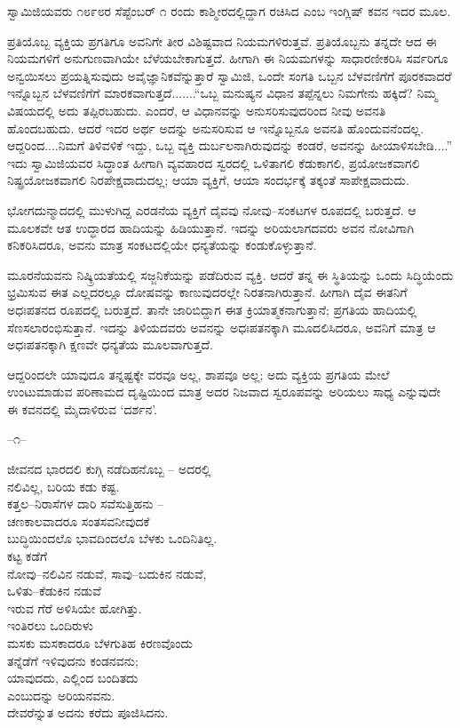 ಸ್ವಾಮಿಜಿಯವರು ೧೮೯೮ರ ಸೆಪ್ಟೆಂಬರ್ ೧ ರಂದು ಕಾಶ್ಮೀರದಲ್ಲಿದ್ದಾಗ ರಚಿಸಿದ  ಎಂಬ ಇಂಗ್ಲಿಷ್ ಕವನ ಇದರ ಮೂಲ.

ಪ್ರತಿಯೊಬ್ಬ ವ್ಯಕ್ತಿಯ ಪ್ರಗತಿಗೂ ಅವನಿಗೇ ತೀರ ವಿಶಿಷ್ಟವಾದ ನಿಯಮಗಳಿರುತ್ತವೆ. ಪ್ರತಿಯೊಬ್ಬನು ತನ್ನದೇ ಆದ ಈ ನಿಯಮಗಳಿಗೆ ಅನುಗುಣವಾಗಿಯೇ ಬೆಳೆಯಬೇಕಾಗುತ್ತದೆ. ಹೀಗಾಗಿ ಈ ನಿಯಮಗಳನ್ನು ಸಾಧಾರಣೀಕರಿಸಿ ಸರ್ವರಿಗೂ ಅನ್ವಯಿಸಲು ಪ್ರಯತ್ನಿಸುವುದು ಅವೈಜ್ಞಾನಿಕವೆನ್ನುತ್ತಾರೆ ಸ್ವಾಮಿಜಿ, ಒಂದೇ ಸಂಗತಿ ಒಬ್ಬನ ಬೆಳವಣಿಗೆಗೆ ಪೂರಕವಾದರೆ ಇನ್ನೊಬ್ಬನ ಬೆಳವಣಿಗೆಗೆ ಮಾರಕವಾಗುತ್ತದೆ.......“ಒಬ್ಬ ಮನುಷ್ಯನ ವಿಧಾನ ತಪ್ಪೆನ್ನಲು ನಿಮಗೇನು ಹಕ್ಕಿದೆ? ನಿಮ್ಮ ವಿಷಯದಲ್ಲಿ ಅದು ತಪ್ಪಿರಬಹುದು. ಎಂದರೆ, ಆ ವಿಧಾನವನ್ನು ಅನುಸರಿಸುವುದರಿಂದ ನೀವು ಅವನತಿ ಹೊಂದಬಹುದು. ಆದರೆ ಇದರ ಅರ್ಥ ಅದನ್ನು ಅನುಸರಿಸುವ ಆ ಇನ್ನೊಬ್ಬನೂ ಅವನತಿ ಹೊಂದುವನೆಂದಲ್ಲ. ಆದ್ದರಿಂದ....ನಿಮಗೆ ತಿಳಿವಳಿಕೆ ಇದ್ದು, ಒಬ್ಬ ವ್ಯಕ್ತಿ ದುರ್ಬಲನಾಗಿರುವುದನ್ನು ಕಂಡರೆ, ಅವನನ್ನು ಹೀಯಾಳಿಸಬೇಡಿ....” ಇದು ಸ್ವಾಮಿಜಿಯವರ ಸಿದ್ಧಾಂತ  ಹೀಗಾಗಿ ವ್ಯವಹಾರದ ಸ್ವರದಲ್ಲಿ ಒಳಿತಾಗಲಿ ಕೆಡುಕಾಗಲಿ, ಪ್ರಯೋಜಕವಾಗಲಿ ನಿಷ್ಪ್ರಯೋಜಕವಾಗಲಿ ನಿರಪೇಕ್ಷವಾದುದಲ್ಲ; ಆಯಾ ವ್ಯಕ್ತಿಗೆ, ಆಯಾ ಸಂದರ್ಭಕ್ಕೆ ತಕ್ಕಂತೆ ಸಾಪೇಕ್ಷವಾದುದು.

ಭೋಗದುನ್ಮಾದದಲ್ಲಿ ಮುಳುಗಿದ್ದ ಎರಡನೆಯ ವ್ಯಕ್ತಿಗೆ ದೈವವು ನೋವು–ಸಂಕಟಗಳ ರೂಪದಲ್ಲಿ ಬರುತ್ತದೆ. ಆ ಮೂಲಕವೇ ಆತ ಉದ್ಧಾರದ ಹಾದಿಯನ್ನು ಹಿಡಿಯುತ್ತಾನೆ. ಇದನ್ನು ಅರಿಯಲಾಗದವರು ಅವನ ನೋವಿಗಾಗಿ ಕನಿಕರಿಸಿದರೂ, ಅವನು ಮಾತ್ರ ಸಂಕಟದಲ್ಲಿಯೇ ಧನ್ಯತೆಯನ್ನು ಕಂಡುಕೊಳ್ಳುತ್ತಾನೆ.

ಮೂರನೆಯವನು ನಿಷ್ಕ್ರಿಯತೆಯಲ್ಲಿ ಸಜ್ಜನಿಕೆಯನ್ನು ಪಡೆದಿರುವ ವ್ಯಕ್ತಿ. ಆದರೆ ತನ್ನ ಈ ಸ್ಥಿತಿಯನ್ನು ಒಂದು ಸಿದ್ಧಿಯೆಂದು ಭ್ರಮಿಸುವ ಈತ ಎಲ್ಲದರಲ್ಲೂ ದೋಷವನ್ನು ಕಾಣುವುದರಲ್ಲೇ ನಿರತನಾಗಿರುತ್ತಾನೆ. ಹೀಗಾಗಿ ದೈವ ಈತನಿಗೆ ಅಧಃಪತನದ ರೂಪದಲ್ಲಿ ಬರುತ್ತದೆ. ತಾನೇ ಜಾರಿಬಿದ್ದಾಗ ಈತ ಕ್ರಿಯಾತ್ಮಕನಾಗುತ್ತಾನೆ; ಪ್ರಗತಿಯ ಹಾದಿಯಲ್ಲಿ ಸೆಣಸಲಾರಂಭಿಸುತ್ತಾನೆ. ಇದನ್ನು ತಿಳಿಯದವರು ಅವನನ್ನು ಅಧಃಪತನಕ್ಕಾಗಿ ಮೂದಲಿಸಿದರೂ, ಅವನಿಗೆ ಮಾತ್ರ ಆ ಅಧಃಪತನಕ್ಕಾಗಿ ಕ್ಷಣವೇ ಧನ್ಯತೆಯ ಮೂಲವಾಗುತ್ತದೆ.

ಆದ್ದರಿಂದಲೇ ಯಾವುದೂ ತನ್ನಷ್ಟಕ್ಕೇ ವರವೂ ಅಲ್ಲ, ಶಾಪವೂ ಅಲ್ಲ; ಅದು ವ್ಯಕ್ತಿಯ ಪ್ರಗತಿಯ ಮೇಲೆ ಉಂಟುಮಾಡುವ ಪರಿಣಾಮದ ದೃಷ್ಟಿಯಿಂದ ಮಾತ್ರ ಅದರ ನಿಜವಾದ ಸ್ವರೂಪವನ್ನು ಅರಿಯಲು ಸಾಧ್ಯ ಎನ್ನುವುದೇ ಈ ಕವನದಲ್ಲಿ ಮೈದಾಳಿರುವ ‘ದರ್ಶನ’.

\begin{center}
–೧–
\end{center}

\begin{myquote}
ಜೀವನದ ಭಾರದಲಿ ಕುಗ್ಗಿ ನಡೆದಿಹನೊಬ್ಬ – ಅದರಲ್ಲಿ\\ನಲಿವಿಲ್ಲ, ಬರಿಯ ಕಡು ಕಷ್ಟ.\\ಕತ್ತಲ–ನಿರಾಸೆಗಳ ದಾರಿ ಸವೆಸುತ್ತಿಹನು –\\ಚಣಕಾಲವಾದರೂ ಸಂತಸವನೀವುದಕೆ\\ಬುದ್ಧಿಯಿಂದಲೊ ಭಾವದಿಂದಲೊ ಬೆಳಕು ಒಂದಿನಿತಿಲ್ಲ.\\ಕಟ್ಟ ಕಡೆಗೆ\\ನೋವು–ನಲಿವಿನ ನಡುವೆ, ಸಾವು–ಬದುಕಿನ ನಡುವೆ,\\ಒಳಿತು–ಕೆಡುಕಿನ ನಡುವೆ\\ಇರುವ ಗೆರೆ ಅಳಿಸಿಯೇ ಹೋಗಿತ್ತು.\\ಇಂತಿರಲು ಒಂದಿರುಳು\\ಮಸಕು ಮಸಕಾದರೂ ಬೆಳಗುತಿಹ ಕಿರಣವೊಂದು\\ತನ್ನೆಡೆಗೆ ಇಳಿವುದನು ಕಂಡನವನು;\\ಯಾವುದದು, ಎಲ್ಲಿಂದ ಬಂದಿತದು\\ಎಂಬುದನ್ನು ಅರಿಯನವನು.\\ದೇವರೆನ್ನುತ ಅದನು ಕರೆದು ಪೂಜಿಸಿದನು.
\end{myquote}

